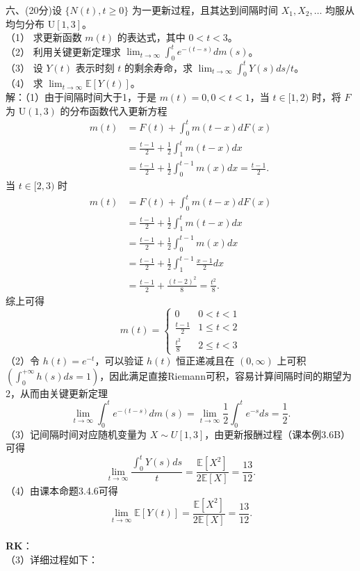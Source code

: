 \documentclass[UTF8]{ctexart}
\begin{document}
\noindent 六、(20分)设 $\{N(t), t \geq 0\}$ 为一更新过程，且其达到间隔时间 $X_1, X_2, \ldots$ 均服从均匀分布 $\mathrm{U}[1, 3]$。\\
（1） 求更新函数 $m(t)$ 的表达式，其中 $0 < t < 3$。\\
（2） 利用关键更新定理求 $\lim_{t \to \infty} \int_0^t e^{-(t-s)} dm(s)$。\\
（3） 设 $Y(t)$ 表示时刻 $t$ 的剩余寿命，求 $\lim_{t \to \infty} \int_0^t Y(s) ds/t$。\\
（4） 求 $\lim_{t \to \infty} \mathbb{E}[Y(t)]$。\\
解：（1）由于间隔时间大于1，于是 $m(t)=0,0<t<1$，当 $t\in[1,2)$ 时，将 $F$ 为 $\mathrm{U}(1,3)$ 的分布函数代入更新方程
$$
\begin{aligned}
	m(t)&=F(t)+\int_{0}^tm(t-x)dF(x)\\
	&=\frac{t-1}{2}+\frac{1}{2}\int_{1}^tm(t-x)dx\\
	&=\frac{t-1}{2}+\frac{1}{2}\int_{0}^{t-1}m(x)dx=\frac{t-1}{2}.
\end{aligned}
$$
当 $t\in[2,3)$ 时
$$
\begin{aligned}
	m(t)&=F(t)+\int_{0}^tm(t-x)dF(x)\\
	&=\frac{t-1}{2}+\frac{1}{2}\int_{1}^tm(t-x)dx\\
	&=\frac{t-1}{2}+\frac{1}{2}\int_{0}^{t-1}m(x)dx\\
	&=\frac{t-1}{2}+\frac{1}{2}\int_{1}^{t-1}\frac{x-1}{2}dx\\
	&=\frac{t-1}{2}+\frac{(t-2)^2}{8}=\frac{t^2}{8}.
\end{aligned}
$$
综上可得
$$
m(t)=
\begin{cases}
	0  &  0<t<1 \\
	\frac{t-1}{2}  &  1\leq t<2\\
	\frac{t^2}{8}  &	2\leq t<3
\end{cases}
$$
（2）令 $h(t)=e^{-t}$，可以验证 $h(t)$ 恒正递减且在 $(0,\infty)$ 上可积$\left( \int_{0}^{+\infty} h(s)ds=1 \right) $，因此满足直接Riemann可积，容易计算间隔时间的期望为2，从而由关键更新定理
$$
\lim_{t\to \infty}\int_{0}^t e^{-(t-s)}dm(s)=\lim_{t\to \infty}\frac{1}{2}\int_{0}^t e^{-s}ds=\frac{1}{2}.$$
（3）记间隔时间对应随机变量为 $X\sim U[1,3]$，由更新报酬过程（课本例3.6B）可得
$$
\lim_{t\to \infty}\frac{\int_{0}^t Y(s)ds}{t}=\frac{\mathbb{E}[X^2]}{2\mathbb{E}[X]}=\frac{13}{12}.
$$
（4）由课本命题3.4.6可得
$$
\lim_{t\to \infty}\mathbb{E}[Y(t)]=\frac{\mathbb{E}[X^2]}{2\mathbb{E}[X]}=\frac{13}{12}.
$$\\
\textbf{RK}：\\
（3）详细过程如下：\\
\end{document}

